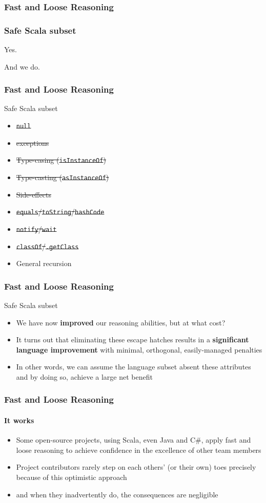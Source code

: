 \begin{frame}[fragile]
\frametitle{Fast and Loose Reasoning}
\frametitle{Safe Scala subset}
\begin{center}
Yes.
\end{center}
\begin{center}
And we do.
\end{center}
\end{frame}

\begin{frame}[fragile]
\frametitle{Fast and Loose Reasoning}
\begin{block}{Safe Scala subset}
\begin{itemize}
  \item \sout{\lstinline{null}}
  \item \sout{exceptions}
  \item \sout{Type-casing (\lstinline{isInstanceOf})}
  \item \sout{Type-casting (\lstinline{asInstanceOf})}
  \item \sout{Side-effects}
  \item \sout{\lstinline{equals}/\lstinline{toString}/\lstinline{hashCode}}
  \item \sout{\lstinline{notify}/\lstinline{wait}}
  \item \sout{\lstinline{classOf}/\lstinline{.getClass}}
  \item General recursion
\end{itemize}
\end{block}
\end{frame}

\begin{frame}[fragile]
\frametitle{Fast and Loose Reasoning}
\begin{block}{Safe Scala subset}
\begin{itemize}
  \item<1> We have now \textbf{improved} our reasoning abilities, but at what cost?
  \item<2> It turns out that eliminating these escape hatches results in a \textbf{significant language improvement} with minimal, orthogonal, easily-managed penalties
  \item<3> In other words, we can assume the language subset absent these attributes and by doing so, achieve a large net benefit
\end{itemize}
\end{block}
\end{frame}

\begin{frame}[fragile]
\frametitle{Fast and Loose Reasoning}
\framesubtitle{It works}
\begin{itemize}
  \item<1> Some open-source projects, using Scala, even Java and C\#, apply fast and loose reasoning to achieve confidence in the excellence of other team members
  \item<2> Project contributors rarely step on each others' (or their own) toes precisely because of this optimistic approach
  \item<3> and when they inadvertently do, the consequences are negligible
\end{itemize}
\end{frame}

